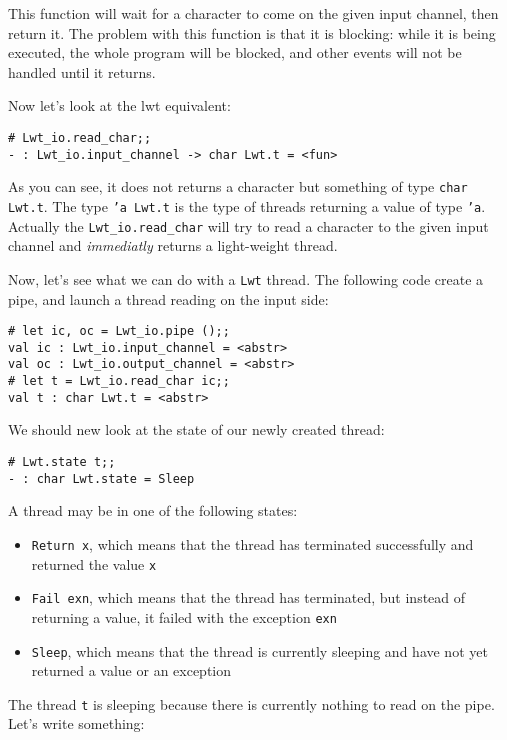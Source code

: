 \documentclass{article}
\newcommand{\lwt}{\texttt{Lwt}\xspace}
\begin{document}
This function will wait for a character to come on the given input
channel, then return it. The problem with this function is that it is
blocking: while it is being executed, the whole program will be
blocked, and other events will not be handled until it returns.

Now let's look at the lwt equivalent:

\begin{verbatim}
# Lwt_io.read_char;;
- : Lwt_io.input_channel -> char Lwt.t = <fun>
\end{verbatim}

As you can see, it does not returns a character but something of type
\texttt{char Lwt.t}. The type \texttt{'a Lwt.t} is the type of threads
returning a value of type \texttt{'a}. Actually the
\texttt{Lwt\_io.read\_char} will try to read a character to the given
input channel and \emph{immediatly} returns a light-weight thread.

Now, let's see what we can do with a \lwt thread. The following code create
a pipe, and launch a thread reading on the input side:

\begin{verbatim}
# let ic, oc = Lwt_io.pipe ();;
val ic : Lwt_io.input_channel = <abstr>
val oc : Lwt_io.output_channel = <abstr>
# let t = Lwt_io.read_char ic;;
val t : char Lwt.t = <abstr>
\end{verbatim}

We should new look at the state of our newly created thread:

\begin{verbatim}
# Lwt.state t;;
- : char Lwt.state = Sleep
\end{verbatim}

A thread may be in one of the following states:

\begin{itemize}
\item \texttt{Return x}, which means that the thread has terminated
  successfully and returned the value \texttt{x}
\item \texttt{Fail exn}, which means that the thread has terminated,
  but instead of returning a value, it failed with the exception
  \texttt{exn}
\item \texttt{Sleep}, which means that the thread is currently
  sleeping and have not yet returned a value or an exception
\end{itemize}

The thread \texttt{t} is sleeping because there is currently nothing
to read on the pipe. Let's write something:
\end{document}
